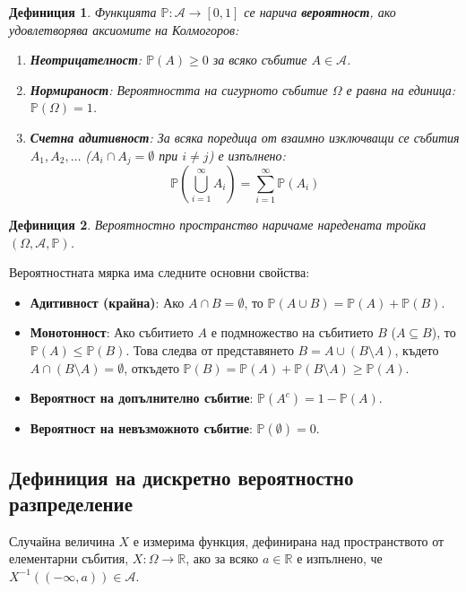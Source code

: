 \documentclass{scrartcl}
\newtheorem{definition}{Дефиниция}
\begin{document}
\begin{FlushLeft}
\begin{definition}
Функцията $\mathbb{P}: \mathcal{A} \to [0, 1]$ се нарича \textbf{вероятност}, ако удовлетворява аксиомите на Колмогоров:
\begin{enumerate}
    \item \textbf{Неотрицателност}: $\mathbb{P}(A) \ge 0$ за всяко събитие $A \in \mathcal{A}$.
    \item \textbf{Нормираност}: Вероятността на сигурното събитие $\Omega$ е равна на единица: $\mathbb{P}(\Omega) = 1$.
    \item \textbf{Счетна адитивност}: За всяка поредица от взаимно изключващи се събития $A_1, A_2, \dots$ ($A_i \cap A_j = \emptyset$ при $i \neq j$) е изпълнено:
    \[ \mathbb{P}\left(\bigcup_{i=1}^{\infty} A_i\right) = \sum_{i=1}^{\infty} \mathbb{P}(A_i) \]
\end{enumerate}
\end{definition}

\begin{definition}
    Вероятностно пространство наричаме наредената тройка $(\Omega, \mathcal{A}, \mathbb{P})$.
\end{definition}

Вероятностната мярка има следните основни свойства:

\begin{itemize}
    \item \textbf{Адитивност (крайна)}: Ако $A \cap B = \emptyset$, то $\mathbb{P}(A \cup B) = \mathbb{P}(A) + \mathbb{P}(B)$.
    \item \textbf{Монотонност}: Ако събитието $A$ е подмножество на събитието $B$ ($A \subseteq B$), то $\mathbb{P}(A) \le \mathbb{P}(B)$. Това следва от представянето $B = A \cup (B \setminus A)$, където $A \cap (B \setminus A) = \emptyset$, откъдето $\mathbb{P}(B) = \mathbb{P}(A) + \mathbb{P}(B \setminus A) \ge \mathbb{P}(A)$.
    \item \textbf{Вероятност на допълнително събитие}: $\mathbb{P}(A^c) = 1 - \mathbb{P}(A)$.
    \item \textbf{Вероятност на невъзможното събитие}: $\mathbb{P}(\emptyset) = 0$.
\end{itemize}

\subsection{Дефиниция на дискретно вероятностно разпределение}
Случайна величина $X$ е измерима функция, дефинирана над пространството от елементарни събития, $X: \Omega \to \mathbb{R}$, ако за всяко $a \in \mathbb{R}$ е изпълнено, че $X^{-1}((-\infty, a)) \in \mathcal{A}$.


\end{FlushLeft}
\end{document}
